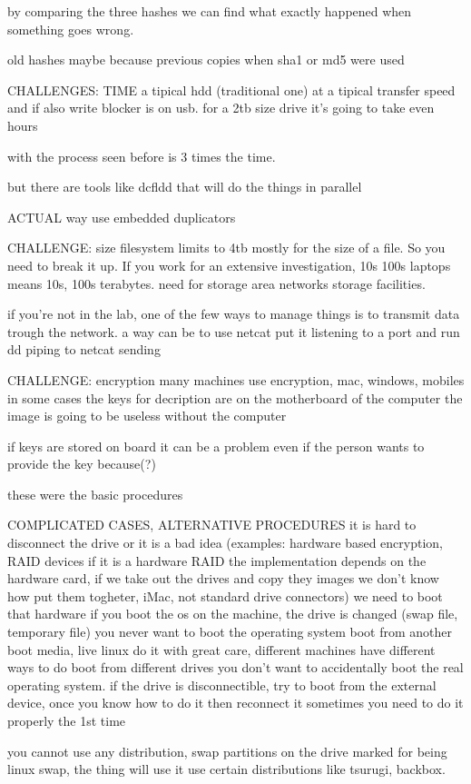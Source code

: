     by comparing the three hashes we can find what exactly happened when something goes wrong. 

    old hashes maybe because previous copies when sha1 or md5 were used 

CHALLENGES: TIME 
    a tipical hdd (traditional one) at a tipical transfer speed and if also write blocker is on usb.
    for a 2tb size drive it's going to take even hours 

    with the process seen before is 3 times the time.

    but there are tools like dcfldd that will do the things in parallel 

ACTUAL way
    use embedded duplicators

CHALLENGE: size 
    filesystem limits to 4tb mostly for the size of a file. So you need to break it up.
    If you work for an extensive investigation, 10s 100s laptops means 10s, 100s terabytes.
    need for storage area networks storage facilities.

    if you're not in the lab, one of the few ways to manage things is to transmit data trough the network.
    a way can be to use netcat
    put it listening to a port 
    and run dd piping to netcat sending 

CHALLENGE: encryption
    many machines use encryption, mac, windows, mobiles 
    in some cases the keys for decription are on the motherboard of the computer 
    the image is going to be useless without the computer 

    if keys are stored on board it can be a problem even if the person wants to provide the key because(?)

these were the basic procedures 

COMPLICATED CASES, ALTERNATIVE PROCEDURES 
    it is hard to disconnect the drive or it is a bad idea (examples: hardware based encryption, RAID devices if it is a hardware RAID the implementation depends on the hardware card, if we take out the drives and copy they images we don't know how put them togheter, iMac, not standard drive connectors)
    we need to boot that hardware
    if you boot the os on the machine, the drive is changed (swap file, temporary file) you never want to boot the operating system
    boot from another boot media, live linux 
        do it with great care, different machines have different ways to do boot from different drives 
        you don't want to accidentally boot the real operating system.
        if the drive is disconnectible, try to boot from the external device, once you know how to do it then reconnect it 
        sometimes you need to do it properly the 1st time 

        you cannot use any distribution, swap partitions on the drive marked for being linux swap, the thing will use it
        use certain distributions like tsurugi, backbox.




